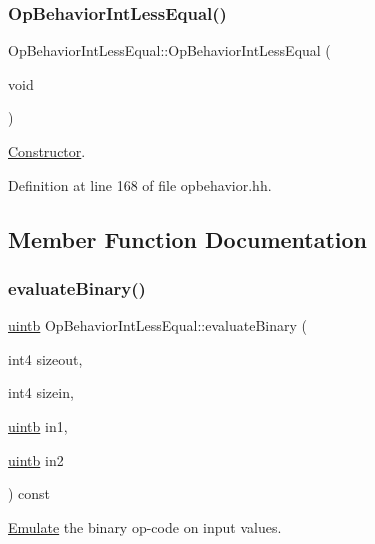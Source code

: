 \subsubsection{\texorpdfstring{OpBehaviorIntLessEqual()}{OpBehaviorIntLessEqual()}}
{\footnotesize\ttfamily Op\+Behavior\+Int\+Less\+Equal\+::\+Op\+Behavior\+Int\+Less\+Equal (\begin{DoxyParamCaption}\item[{void}]{ }\end{DoxyParamCaption})\hspace{0.3cm}{\ttfamily [inline]}}



\mbox{\hyperlink{class_constructor}{Constructor}}. 



Definition at line 168 of file opbehavior.\+hh.



\subsection{Member Function Documentation}
\mbox{\label{class_op_behavior_int_less_equal_a363b55cdb62281f6f2d6f53f2963c435}} 
\subsubsection{\texorpdfstring{evaluateBinary()}{evaluateBinary()}}
{\footnotesize\ttfamily \mbox{\hyperlink{types_8h_a2db313c5d32a12b01d26ac9b3bca178f}{uintb}} Op\+Behavior\+Int\+Less\+Equal\+::evaluate\+Binary (\begin{DoxyParamCaption}\item[{int4}]{sizeout,  }\item[{int4}]{sizein,  }\item[{\mbox{\hyperlink{types_8h_a2db313c5d32a12b01d26ac9b3bca178f}{uintb}}}]{in1,  }\item[{\mbox{\hyperlink{types_8h_a2db313c5d32a12b01d26ac9b3bca178f}{uintb}}}]{in2 }\end{DoxyParamCaption}) const\hspace{0.3cm}{\ttfamily [virtual]}}



\mbox{\hyperlink{class_emulate}{Emulate}} the binary op-\/code on input values. 


